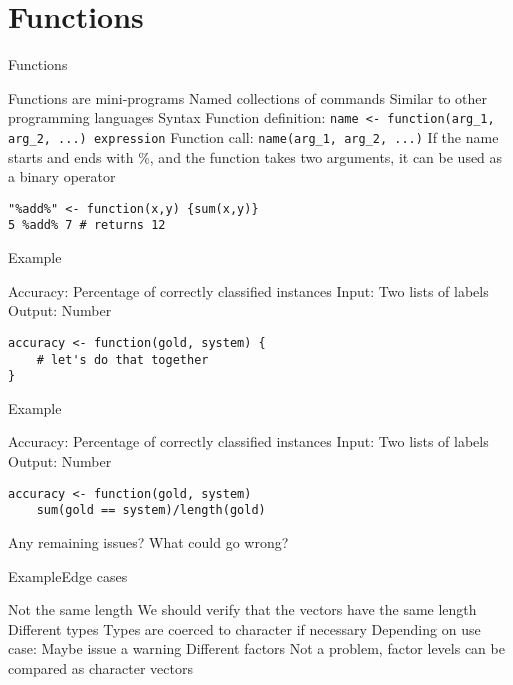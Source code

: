 \documentclass[aspectratio=169]{beamer}
\begin{document}
\section{Functions}

\begin{frame}[fragile]{Functions}
\begin{outline}
\1 Functions are mini-programs
\1 Named collections of commands
\1 Similar to other programming languages
\1 Syntax
\2 Function definition: \lstinline!name <- function(arg_1, arg_2, ...) expression!
\2 Function call: \lstinline!name(arg_1, arg_2, ...)!
\pause
\2 If the name starts and ends with \%, and the function takes two arguments, it can be used as a binary operator \\
\begin{lstlisting}
"%add%" <- function(x,y) {sum(x,y)}
5 %add% 7 # returns 12
\end{lstlisting} 
\end{outline}
\end{frame}

\begin{frame}[fragile]{Example}
\begin{outline}
\1 Accuracy: Percentage of correctly classified instances
\1 Input: Two lists of labels
\1 Output: Number
\end{outline}
\begin{lstlisting}
accuracy <- function(gold, system) {
    # let's do that together
}
\end{lstlisting}
\end{frame}

\begin{frame}[fragile]{Example}
\begin{outline}
\1 Accuracy: Percentage of correctly classified instances
\1 Input: Two lists of labels
\1 Output: Number
\end{outline}
\begin{lstlisting}
accuracy <- function(gold, system)
    sum(gold == system)/length(gold)
\end{lstlisting}
Any remaining issues? What could go wrong?
\end{frame}

\begin{frame}{Example}{Edge cases}
\begin{outline}
\0 Not the same length
\1 We should verify that the vectors have the same length
\0 Different types
\1 Types are coerced to character if necessary
\2 Depending on use case: Maybe issue a warning
\0 Different factors
\1 Not a problem, factor levels can be compared as character vectors
\end{outline}
\end{frame}
\end{document}
